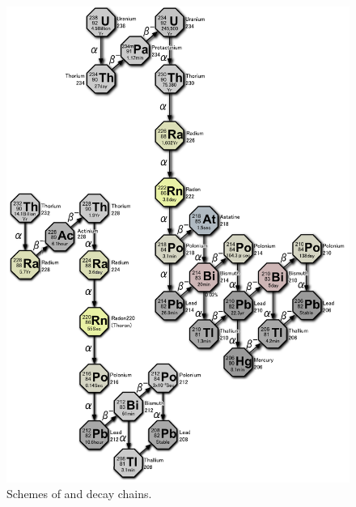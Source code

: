 	\begin{figure}
		\centerline{%
			\includegraphics[width=\linewidth]{img/chains.png}
		}
		\caption{Schemes of  and  decay chains.}\label{fig:chains}
	\end{figure}
\restoregeometry
